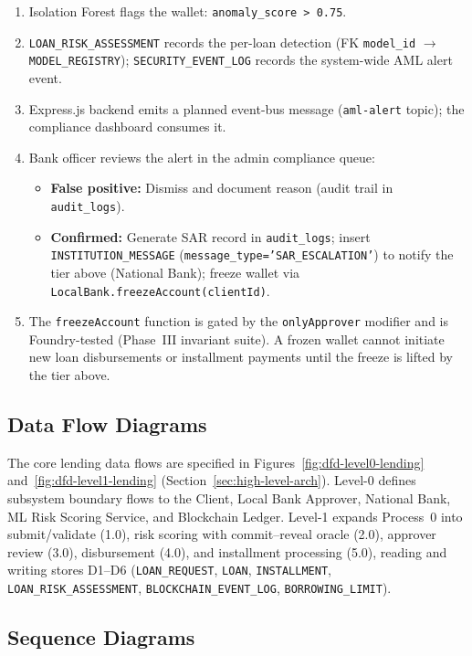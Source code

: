 \documentclass[12pt,a4paper]{report}
\begin{document}
\begin{enumerate}[noitemsep]
\item Isolation Forest flags the wallet: \texttt{anomaly\_score > 0.75}.
\item \texttt{LOAN\_RISK\_ASSESSMENT} records the per-loan detection (FK \texttt{model\_id} $\to$ \texttt{MODEL\_REGISTRY}); \texttt{SECURITY\_EVENT\_LOG} records the system-wide AML alert event.
\item Express.js backend emits a planned event-bus message (\texttt{aml-alert} topic); the compliance dashboard consumes it.
\item Bank officer reviews the alert in the admin compliance queue:
    \begin{itemize}[noitemsep]
    \item \textbf{False positive:} Dismiss and document reason (audit trail in \texttt{audit\_logs}).
    \item \textbf{Confirmed:} Generate SAR record in \texttt{audit\_logs}; insert \texttt{INSTITUTION\_MESSAGE} (\texttt{message\_type='SAR\_ESCALATION'}) to notify the tier above (National Bank); freeze wallet via \texttt{LocalBank.freezeAccount(clientId)}.
    \end{itemize}
\item The \texttt{freezeAccount} function is gated by the \texttt{onlyApprover} modifier and is Foundry-tested (Phase~III invariant suite). A frozen wallet cannot initiate new loan disbursements or installment payments until the freeze is lifted by the tier above.
\end{enumerate}

\subsection{Data Flow Diagrams}

The core lending data flows are specified in Figures~\ref{fig:dfd-level0-lending} and~\ref{fig:dfd-level1-lending} (Section~\ref{sec:high-level-arch}). Level-0 defines subsystem boundary flows to the Client, Local Bank Approver, National Bank, ML Risk Scoring Service, and Blockchain Ledger. Level-1 expands Process~0 into submit/validate (1.0), risk scoring with commit--reveal oracle (2.0), approver review (3.0), disbursement (4.0), and installment processing (5.0), reading and writing stores D1--D6 (\texttt{LOAN\_REQUEST}, \texttt{LOAN}, \texttt{INSTALLMENT}, \texttt{LOAN\_RISK\_ASSESSMENT}, \texttt{BLOCKCHAIN\_EVENT\_LOG}, \texttt{BORROWING\_LIMIT}).

\subsection{Sequence Diagrams}
\end{document}
